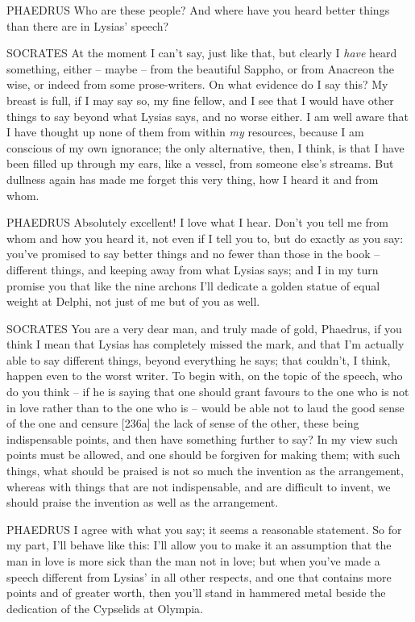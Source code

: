  PHAEDRUS Who are these people? And where have you heard better
things than there are in Lysias' speech?

SOCRATES At the moment I can't say, just like that, but clearly I
{\em have} heard
something, either --
maybe -- from the beautiful Sappho, or from Anacreon the wise, or indeed
from some 
prose-writers. On what
evidence do I say this? My breast is full, if I may say so, my fine
fellow, and I see that I would have other things to say beyond what
Lysias says, and no worse either. I am well aware that I have thought up
none of them from within {\em my} resources, because I am conscious of
my own ignorance; the only alternative, then, I think, is that I have
been  filled up through my ears, like a vessel, from someone
else's streams. But dullness again has made me forget this very thing,
how I heard it and from whom.

PHAEDRUS Absolutely
excellent! I love what I
hear. Don't  you tell me from whom and how you heard it, not
even if I tell you to, but do exactly as you say: you've promised to say
better things and no fewer than those in the book -- different things,
and keeping away from what Lysias says; and I in my turn promise you
that like the nine
archons I'll dedicate a
golden statue of equal weight at Delphi, not just of me but of you as
 well.

SOCRATES You are a very dear man, and truly made of gold, Phaedrus, if
you think I mean that Lysias has completely missed the mark, and that
I'm actually able to say different things, beyond everything he says;
that couldn't, I think, happen even  to the worst writer. To
begin with, on the topic of the speech, who do you think -- if he is
saying that one should grant favours to the one who is not in love
rather than to the one who is -- would be able not to laud the good
sense of the one and censure {[}236a{]} the lack of sense of the other,
these being indispensable points, and then have something further to
say? In my view such points must be allowed, and one should be forgiven
for making them; with such things, what should be praised is not so much
the invention as the arrangement, whereas with things that are not
indispensable, and are difficult to invent, we should praise the
 invention as well as the arrangement.

PHAEDRUS I agree with what you say; it seems a reasonable statement. So
for my part, I'll behave like this: I'll allow you to make it an
assumption that the man in love is more sick than  the man not
in love; but when you've made a speech different from Lysias' in all
other respects, and one that contains more points and of greater worth,
then you'll stand in hammered metal beside the dedication of the
Cypselids at Olympia.

